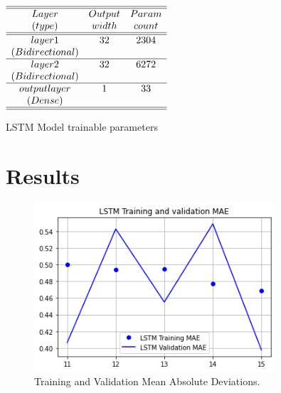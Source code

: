 \documentclass[twoside]{article}
\begin{document}
\begin{table}
\centering \(\begin{array}{cccccccccccc}

\hline
\hline
 Layer      &Output  &Param    \\
 (type)    &  width& count \\
\hline
\hline
layer 1            &32   &     2304     \\ 
 (Bidirectional)      &  & \     \\                                                    
\hline
layer 2            &32          &    6272      \\
 (Bidirectional)                 &  & \\                                                                                                    
 \hline
output layer   &    1          &      33        \\
 (Dense)                 &  & \\                                                                                                    
\hline
\hline
\end{array}\)
\caption{LSTM Model trainable parameters }
\label{tab:model}
\end{table}

\section{\label{sec3}Results}

\begin{figure}
\centering
\includegraphics[width=0.8\textwidth]{3.png}
\caption[]{ 
  Training and Validation Mean Absolute Deviations.
  }
\vspace{1mm}
\label{z3}
\end{figure}
\end{document}
